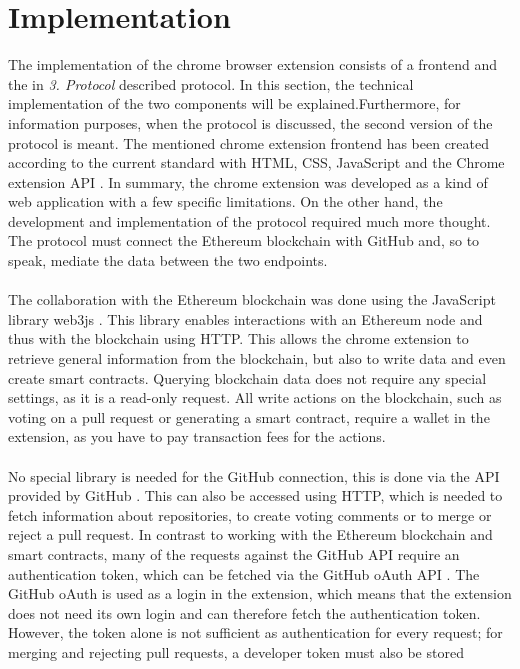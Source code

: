 \documentclass[sigconf]{acmart}
\begin{document}
\section{Implementation}
The implementation of the chrome browser extension consists of a frontend and the in \textit{3. Protocol} described protocol.
In this section, the technical implementation of the two components will be explained.Furthermore, for information purposes, 
when the protocol is discussed, the second version of the protocol is meant.
The mentioned chrome extension frontend has been created according to the current standard with HTML, CSS, JavaScript 
and the Chrome extension API \cite{chrome2021api}. In summary, the chrome extension was developed as a kind of web application 
with a few specific limitations. On the other hand, the development and implementation of the protocol required much more thought.
The protocol must connect the Ethereum blockchain with GitHub and, so to speak, mediate the data between the two endpoints. \\ \\
The collaboration with the Ethereum blockchain was done using the JavaScript library web3js \cite{web32021js}. 
This library enables interactions with an 
Ethereum node and thus with the blockchain using HTTP. This allows the chrome extension to retrieve general information from the 
blockchain, but also to write data and even create smart contracts. Querying blockchain data does not require any special settings, 
as it is a read-only request. All write actions on the blockchain, such as voting on a pull request or generating a smart contract, require
 a wallet in the extension, as you have to pay transaction fees for the actions. \\ \\
No special library is needed for the GitHub connection, this is done via the API provided by GitHub \cite{git2021api}. 
This can also be accessed using 
HTTP, which is needed to fetch information about repositories, to create voting comments or to merge or reject a pull request.
In contrast to working with the Ethereum blockchain and smart contracts, many of the requests against the GitHub API require an 
authentication token, which can be fetched via the GitHub oAuth API \cite{git2021auth}. The GitHub oAuth is used as a login in the extension, which
 means that the extension does not need its own login and can therefore fetch the authentication token. However, the token alone 
is not sufficient as authentication for every request; for merging and rejecting pull requests, a developer token must also be stored 
\end{document}
